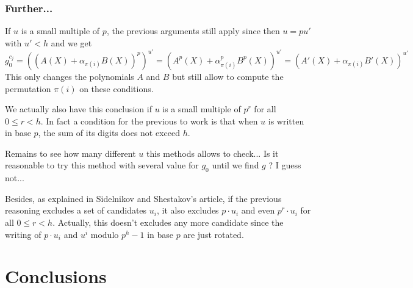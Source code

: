 \documentclass[12pt,a4paper,titlepage]{article}
\begin{document}
\subsubsection{Further...}

If $u$ is a small multiple of $p$, the previous arguments still apply since then $u = p u'$ with $u' < h$ and we get
$$ g_0^{c_j} = \left( \left( A(X) + \alpha_{\pi(i)} B(X) \right)^p \right)^{u'} = \left( A^p(X) + \alpha_{\pi(i)}^p B^p(X) \right)^{u'} = \left( A'(X) + \alpha_{\pi(i)} B'(X) \right)^{u'}$$
This only changes the polynomials $A$ and $B$ but still allow to compute the permutation $\pi(i)$ on these conditions.

We actually also have this conclusion if $u$ is a small multiple of $p^r$ for all $0 \leq r < h$.
In fact a condition for the previous to work is that when $u$ is written in base $p$, the sum of its digits does not exceed $h$.

Remains to see how many different $u$ this methods allows to check... Is it reasonable to try this method with several value for $g_0$ until we find $g$ ? I guess not...

Besides, as explained in Sidelnikov and Shestakov's article, if the previous reasoning excludes a set of candidates $u_i$, it also excludes $p \cdot u_i$ and even $p^r \cdot u_i$ for all $0 \leq r < h$. Actually, this doesn't excludes any more candidate since the writing of $p\cdot u_i$ and $u^i$ modulo $p^h-1$ in base $p$ are just rotated.



\section{Conclusions}






\newpage
\appendix
\end{document}

